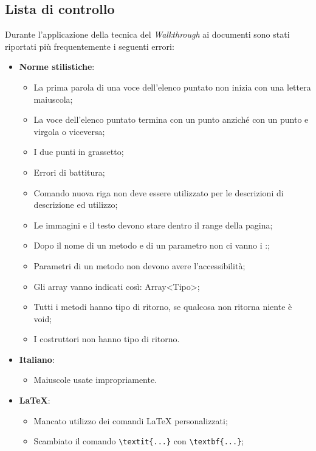 \subsection{Lista di controllo}
Durante l'applicazione della tecnica del \textit{Walkthrough} ai documenti sono stati riportati
più frequentemente i seguenti errori:
\begin{itemize}
  \item\textbf{Norme stilistiche}:
  \begin{itemize}
    \item La prima parola di una voce dell'elenco puntato non inizia con una lettera maiuscola;
    \item La voce dell'elenco puntato termina con un punto anziché con un punto e virgola o viceversa;
    \item I due punti in grassetto;
    \item Errori di battitura;
    \item Comando nuova riga non deve essere utilizzato per le descrizioni di descrizione ed utilizzo;
    \item Le immagini e il testo devono stare dentro il range della pagina;
    \item Dopo il nome di un metodo e di un parametro non ci vanno i :;
    \item Parametri di un metodo non devono avere l'accessibilità;
    \item Gli array vanno indicati così: Array<Tipo>;
    \item Tutti i metodi hanno tipo di ritorno, se qualcosa non ritorna niente è void;
    \item I costruttori non hanno tipo di ritorno. 
     
  \end{itemize}

  \item\textbf{Italiano}:
  \begin{itemize}
    \item Maiuscole usate impropriamente.
    
  \end{itemize}

  \item\textbf{\LaTeX}:
  \begin{itemize}
  \item Mancato utilizzo dei comandi \LaTeX{} personalizzati;
  \item Scambiato il comando \verb|\textit{...}| con \verb|\textbf{...}|;
  

\end{itemize}
\end{itemize}
